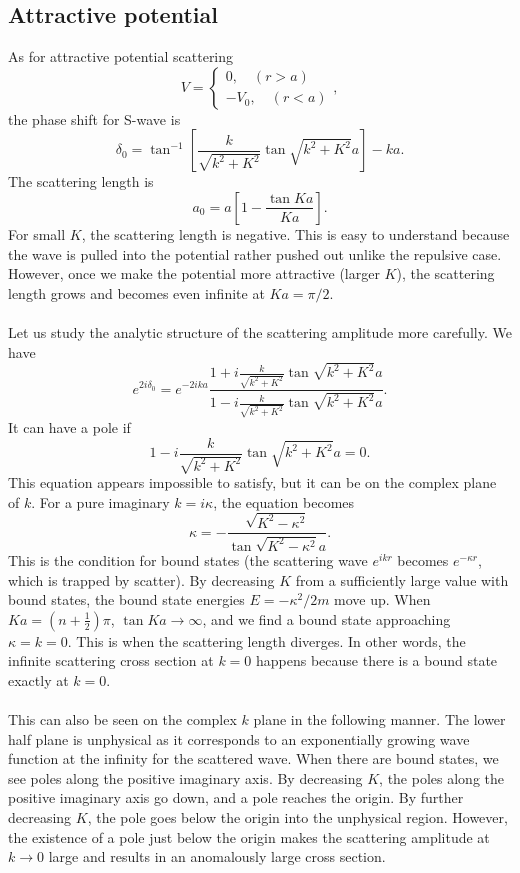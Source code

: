\subsection{Attractive potential}
As for attractive potential scattering
\[V = \begin{cases} 0 , \quad (r > a) \\ -V_0 , \quad (r < a)\end{cases},\]
the phase shift for S-wave is
\[\delta_0 = \tan^{-1} \left[\frac{k}{\sqrt{k^2+K^2}} \tan\sqrt{k^2+K^2}a \right]-ka.\]
The scattering length is
\[a_0 = a\left[ 1 - \frac{\tan Ka}{Ka} \right] .\]
For small $K$, the scattering length is negative. This is easy to understand because the wave is pulled into the potential rather pushed out unlike the repulsive case. However, once we
make the potential more attractive (larger $K$), the scattering length grows and becomes even infinite at $Ka = {\pi}/{2}$.
\\ \\
Let us study the analytic structure of the scattering amplitude more carefully. We have
\[e^{2i\delta_0} = e^{-2ika} \frac{1 + i \frac{k}{\sqrt{k^2+K^2}} \tan\sqrt{k^2+K^2}a}{1 - i \frac{k}{\sqrt{k^2+K^2}} \tan\sqrt{k^2+K^2}a}.\]
It can have a pole if
\[1 - i \frac{k}{\sqrt{k^2+K^2}} \tan\sqrt{k^2+K^2}a = 0.\]
This equation appears impossible to satisfy, but it can be on the complex plane of $k$. For a pure imaginary $k = i\kappa$, the equation becomes
\[\kappa = - \frac{\sqrt{K^2-\kappa^2}}{\tan \sqrt{K^2-\kappa^2}a}.\]
This is the condition for bound states (the scattering wave $e^{ikr}$ becomes $e^{-\kappa r}$, which is trapped by scatter). By decreasing $K$ from a sufficiently large value with bound states, the bound state energies $E = -{\kappa^2}/{2m}$ move up. When $Ka = (n + \frac{1}{2})\pi$, $\tan Ka \to \infty$, and we find a bound state approaching $\kappa = k = 0$. 
This is when the scattering length diverges. In other words, the infinite scattering cross section at $k = 0$ happens because there is a bound state exactly at $ k = 0$.
\\ \\
This can also be seen on the complex $k$ plane in the following manner. The lower half plane is unphysical as it corresponds to an exponentially growing wave function at the infinity for the scattered wave. 
When there are bound states, we see poles along the positive imaginary axis. By decreasing $K$, the poles along the positive imaginary axis go down, and a pole reaches the origin. 
By further decreasing $K$, the pole goes below the origin into the unphysical region. 
However, the existence of a pole just below the origin makes the scattering amplitude at $k \to 0$ large and results in an anomalously large cross section. 

